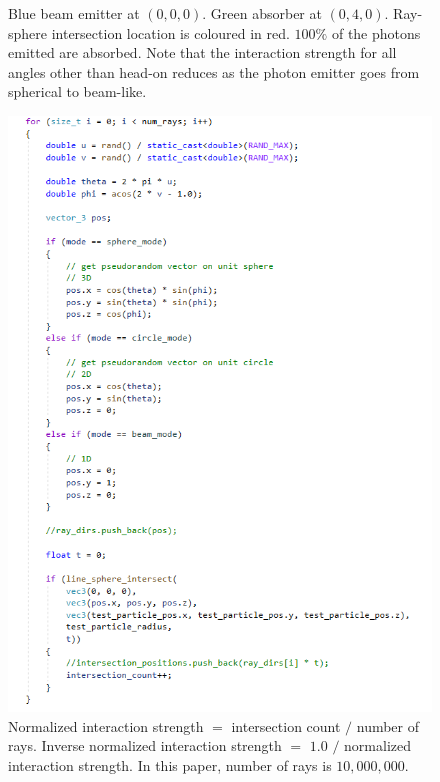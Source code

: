\documentclass[12pt]{article}
\begin{document}
\begin{figure} 
\centering
{}
  \caption{
Blue beam emitter at $(0, 0, 0)$. 
Green absorber at $(0, 4, 0)$. 
Ray-sphere intersection location is coloured in red.
$100\%$ of the photons emitted are absorbed.
Note that the interaction strength for all angles other than head-on reduces as the photon emitter goes from spherical to beam-like.
}
\end{figure}



\begin{figure} 
\centering
  \includegraphics[width = 5 in]{code.png}	
  \caption{Normalized interaction strength $=$ intersection count $/$ number of rays.
Inverse normalized interaction strength $=$ $1.0$ $/$ normalized interaction strength.
In this paper, number of rays is $10,000,000$.
}
\end{figure}
\end{document}
